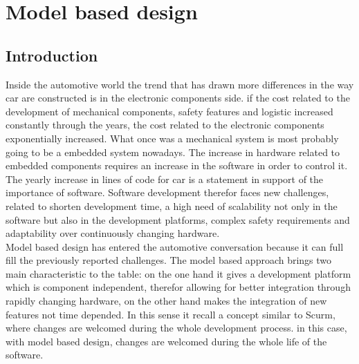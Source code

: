 \documentclass[../main.tex]{subfiles}
\begin{document}
\section{Model based design}
\subsection{Introduction}
Inside the automotive world the trend that has drawn more differences in the way car are constructed is in the electronic components side. if the cost related to the development of mechanical components, safety features and logistic increased constantly through the years, the cost related to the electronic components exponentially increased. What once was a mechanical system is most probably going to be a embedded system nowadays. The increase in hardware related to embedded components requires an increase in the software in order to control it. The yearly increase in lines of code for car is a statement in support of the importance of software. 
Software development therefor faces new challenges, related to shorten development time, a high need of scalability  not only in the software but also in the development platforms, complex safety requirements and adaptability over continuously changing hardware.\\
Model based design has entered the automotive conversation because it can full fill the previously reported challenges. The model based approach brings two main characteristic to the table: on the one hand it gives a development platform which is component independent, therefor allowing for better integration through rapidly changing hardware, on the other hand makes the integration of new features not time depended. In this sense it recall a concept similar to Scurm, where changes are welcomed during the whole development process. in this case, with model based design, changes are welcomed during the whole life of the software.
\end{document}
